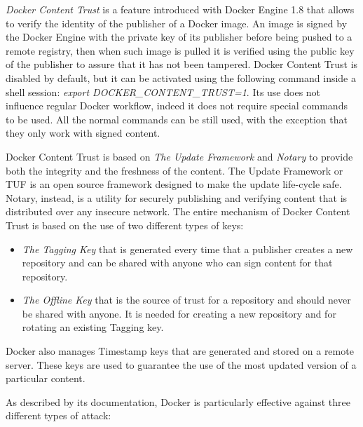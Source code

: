 \documentclass[a4paper,12pt]{article}
\begin{document}
\textit{Docker Content Trust} \cite{docker_content_trust} is a feature
introduced with Docker Engine 1.8 that allows to verify the identity of the
publisher of a Docker image. An image is signed by the Docker Engine with the
private key of its publisher before being pushed to a remote registry, then when
such image is pulled it is verified using the public key of the publisher to
assure that it has not been tampered. Docker Content Trust is disabled by
default, but it can be activated using the following command inside a shell
session: \textit{export DOCKER\_CONTENT\_TRUST=1}. Its use does not influence
regular Docker workflow, indeed it does not require special commands to be used.
All the normal commands can be still used, with the exception that they only
work with signed content. \par Docker Content Trust is based on \textit{The
Update Framework} and \textit{Notary} to provide both the integrity and the
freshness of the content. The Update Framework or TUF is an open source
framework designed to make the update life-cycle safe. Notary, instead, is a
utility for securely publishing and verifying content that is distributed over
any insecure network. The entire mechanism of Docker Content Trust is based on
the use of two different types of keys: 
\begin{itemize}
  \item \textit{The Tagging Key} that is generated every time that a publisher
  creates a new repository and can be shared with anyone who can sign content
  for that repository. 
  \item \textit{The Offline Key} that is the source of trust for a repository
  and should never be shared with anyone. It is needed for creating a new
  repository and for rotating an existing Tagging key. 
\end{itemize}
Docker also manages Timestamp keys that are generated and stored on a remote
server. These keys are used to guarantee the use of the most updated version of
a particular content. \par As described by its documentation, Docker is
particularly effective against three different types of attack:
\end{document}
